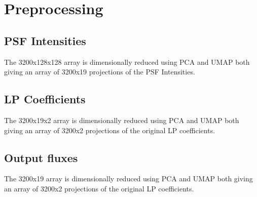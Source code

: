 \section{Preprocessing}

	\subsection{PSF Intensities}
		The 3200x128x128 array is dimensionally reduced using PCA and UMAP both giving an array of 3200x19 projections of the PSF Intensities.
		
	\subsection{LP Coefficients}
		The 3200x19x2 array is dimensionally reduced using PCA and UMAP both giving an array of 3200x2 projections of the original LP coefficients.
		
	\subsection{Output fluxes}
		The 3200x19 array is dimensionally reduced using PCA and UMAP both giving an array of 3200x2 projections of the original LP coefficients.